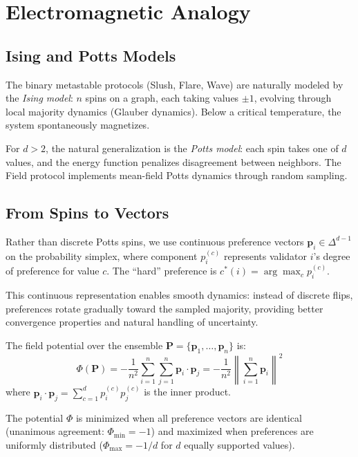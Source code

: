 \section{Electromagnetic Analogy}

\label{sec:analogy}

\subsection{Ising and Potts Models}

The binary metastable protocols (Slush, Flare, Wave) are naturally modeled by the
\emph{Ising model}: $n$ spins on a graph, each taking values $\pm 1$, evolving through
local majority dynamics (Glauber dynamics). Below a critical temperature, the system
spontaneously magnetizes.

For $d > 2$, the natural generalization is the \emph{Potts model}: each spin takes
one of $d$ values, and the energy function penalizes disagreement between neighbors.
The Field protocol implements mean-field Potts dynamics through random sampling.

\subsection{From Spins to Vectors}

Rather than discrete Potts spins, we use continuous preference vectors
$\mathbf{p}_i \in \Delta^{d-1}$ on the probability simplex, where component $p_i^{(c)}$
represents validator $i$'s degree of preference for value $c$. The ``hard'' preference
is $c^*(i) = \arg\max_c p_i^{(c)}$.

This continuous representation enables smooth dynamics: instead of discrete flips,
preferences rotate gradually toward the sampled majority, providing better convergence
properties and natural handling of uncertainty.

\begin{definition}
\label{def:potential}
The field potential over the ensemble $\mathbf{P} = \{\mathbf{p}_1, \ldots, \mathbf{p}_n\}$ is:
\begin{equation}
\Phi(\mathbf{P}) = -\frac{1}{n^2} \sum_{i=1}^{n} \sum_{j=1}^{n} \mathbf{p}_i \cdot \mathbf{p}_j
= -\frac{1}{n^2} \left\| \sum_{i=1}^{n} \mathbf{p}_i \right\|^2
\label{eq:potential}
\end{equation}
where $\mathbf{p}_i \cdot \mathbf{p}_j = \sum_{c=1}^{d} p_i^{(c)} p_j^{(c)}$ is the inner product.
\end{definition}

The potential $\Phi$ is minimized when all preference vectors are identical (unanimous
agreement: $\Phi_{\min} = -1$) and maximized when preferences are uniformly distributed
($\Phi_{\max} = -1/d$ for $d$ equally supported values).

